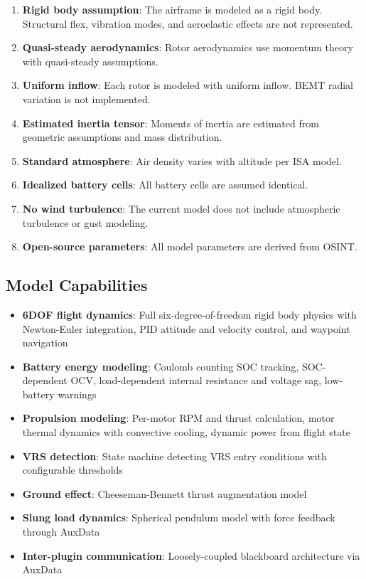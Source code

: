 \documentclass[11pt, letterpaper]{article}
\begin{document}
\begin{enumerate}
    \item \unclass \textbf{Rigid body assumption}: The airframe is modeled as a rigid body. Structural flex, vibration modes, and aeroelastic effects are not represented.
    \item \unclass \textbf{Quasi-steady aerodynamics}: Rotor aerodynamics use momentum theory with quasi-steady assumptions.
    \item \unclass \textbf{Uniform inflow}: Each rotor is modeled with uniform inflow. BEMT radial variation is not implemented.
    \item \unclass \textbf{Estimated inertia tensor}: Moments of inertia are estimated from geometric assumptions and mass distribution.
    \item \unclass \textbf{Standard atmosphere}: Air density varies with altitude per ISA model.
    \item \unclass \textbf{Idealized battery cells}: All battery cells are assumed identical.
    \item \unclass \textbf{No wind turbulence}: The current model does not include atmospheric turbulence or gust modeling.
    \item \unclass \textbf{Open-source parameters}: All model parameters are derived from OSINT.
\end{enumerate}

\subsection{\unclass Model Capabilities}

\begin{itemize}
    \item \unclass \textbf{6DOF flight dynamics}: Full six-degree-of-freedom rigid body physics with Newton-Euler integration, PID attitude and velocity control, and waypoint navigation
    \item \unclass \textbf{Battery energy modeling}: Coulomb counting SOC tracking, SOC-dependent OCV, load-dependent internal resistance and voltage sag, low-battery warnings
    \item \unclass \textbf{Propulsion modeling}: Per-motor RPM and thrust calculation, motor thermal dynamics with convective cooling, dynamic power from flight state
    \item \unclass \textbf{VRS detection}: State machine detecting VRS entry conditions with configurable thresholds
    \item \unclass \textbf{Ground effect}: Cheeseman-Bennett thrust augmentation model
    \item \unclass \textbf{Slung load dynamics}: Spherical pendulum model with force feedback through AuxData
    \item \unclass \textbf{Inter-plugin communication}: Loosely-coupled blackboard architecture via AuxData
\end{itemize}
\end{document}
